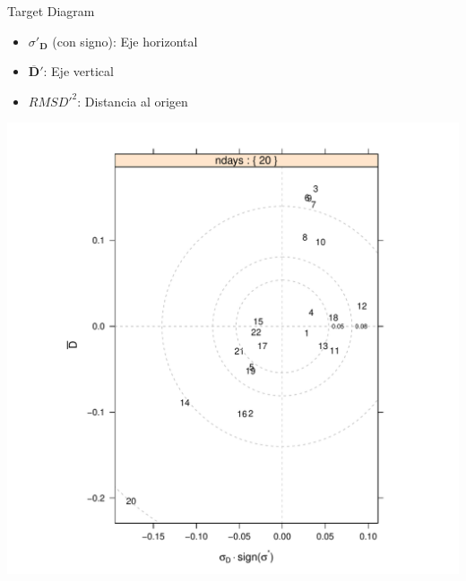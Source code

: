 \documentclass[xcolor={usenames,svgnames,dvipsnames}]{beamer}
\begin{document}
\begin{frame}[label={sec:org5ec31ce}]{Target Diagram}
\begin{itemize}
\item \(\sigma'_{\mathbf{D}}\) (con signo): Eje horizontal
\item \(\overline{\mathbf{D}}'\): Eje vertical
\item \(RMSD'^2\): Distancia al origen
\end{itemize}

\begin{center}
\begin{center}
\includegraphics[height=0.7\textheight]{../figs/TargetDiagram.pdf}
\end{center}
\end{center}
\end{frame}
\end{document}
